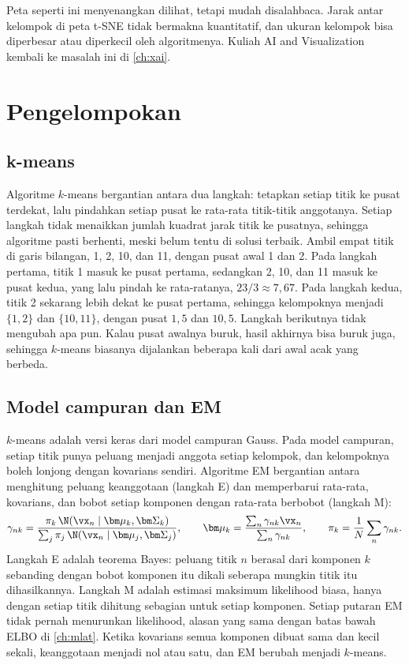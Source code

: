 Peta seperti ini menyenangkan dilihat, tetapi mudah disalahbaca. Jarak antar kelompok di peta
t-SNE tidak bermakna kuantitatif, dan ukuran kelompok bisa diperbesar atau diperkecil oleh
algoritmenya. Kuliah AI and Visualization kembali ke masalah ini di \cref{ch:xai}.

\section{Pengelompokan}

\subsection{k-means}

Algoritme $k$-means \citep{lloyd1982} bergantian antara dua langkah: tetapkan setiap titik ke pusat
terdekat, lalu pindahkan setiap pusat ke rata-rata titik-titik anggotanya. Setiap langkah tidak
menaikkan jumlah kuadrat jarak titik ke pusatnya, sehingga algoritme pasti berhenti, meski belum
tentu di solusi terbaik. Ambil empat titik di garis bilangan, 1, 2, 10, dan 11, dengan pusat awal 1
dan 2. Pada langkah pertama, titik 1 masuk ke pusat pertama, sedangkan 2, 10, dan 11 masuk ke pusat
kedua, yang lalu pindah ke rata-ratanya, $23/3\approx7{,}67$. Pada langkah kedua, titik 2 sekarang
lebih dekat ke pusat pertama, sehingga kelompoknya menjadi $\{1,2\}$ dan $\{10,11\}$, dengan pusat
$1{,}5$ dan $10{,}5$. Langkah berikutnya tidak mengubah apa pun. Kalau pusat awalnya buruk, hasil
akhirnya bisa buruk juga, sehingga $k$-means biasanya dijalankan beberapa kali dari awal acak yang
berbeda.

\subsection{Model campuran dan EM}

$k$-means adalah versi keras dari model campuran Gauss. Pada model campuran, setiap titik punya
peluang menjadi anggota setiap kelompok, dan kelompoknya boleh lonjong dengan kovarians sendiri.
Algoritme EM bergantian antara menghitung peluang keanggotaan (langkah E) dan memperbarui rata-rata,
kovarians, dan bobot setiap komponen dengan rata-rata berbobot (langkah M):
\begin{equation}
\gamma_{nk}=\frac{\pi_k\,\N(\vx_n\mid\bm\mu_k,\bm\Sigma_k)}{\sum_j\pi_j\,\N(\vx_n\mid\bm\mu_j,\bm\Sigma_j)},\qquad
\bm\mu_k=\frac{\sum_n\gamma_{nk}\vx_n}{\sum_n\gamma_{nk}},\qquad \pi_k=\frac1N\sum_n\gamma_{nk}.
\end{equation}
Langkah E adalah teorema Bayes: peluang titik $n$ berasal dari komponen $k$ sebanding dengan bobot komponen itu dikali
seberapa mungkin titik itu dihasilkannya. Langkah M adalah estimasi maksimum likelihood biasa, hanya dengan setiap titik
dihitung sebagian untuk setiap komponen. Setiap putaran EM tidak pernah menurunkan likelihood, alasan yang sama dengan
batas bawah ELBO di \cref{ch:mlat}. Ketika kovarians semua
komponen dibuat sama dan kecil sekali, keanggotaan menjadi nol atau satu, dan EM berubah menjadi
$k$-means.

